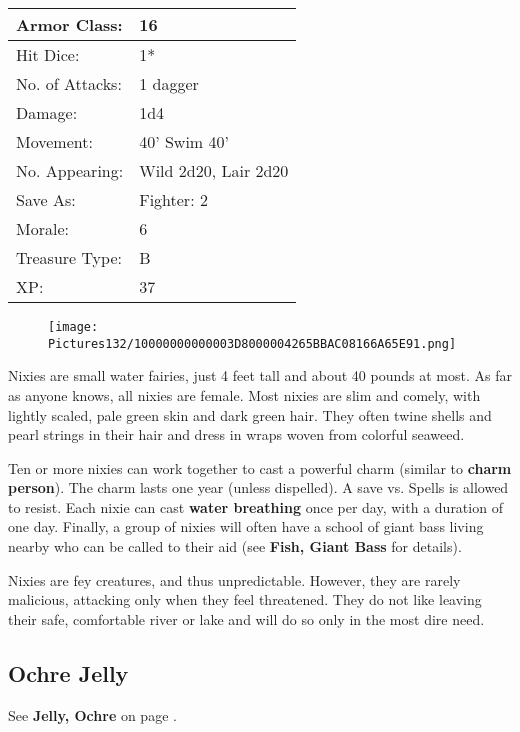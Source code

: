 \documentclass[a4paper,twoside,openany,10pt]{book}
\begin{document}
\begin{multicols}{2}
\begin{tabularx}{0.50\textwidth}{@{}lX@{}}
Armor Class: & 16 \\\hline
Hit Dice: & 1* \\\hline
No. of Attacks: & 1 dagger \\\hline
Damage: & 1d4 \\\hline
Movement: & 40' Swim 40' \\\hline
No. Appearing: & Wild 2d20, Lair 2d20 \\\hline
Save As: & Fighter: 2 \\\hline
Morale: & 6 \\\hline
Treasure Type: & B \\\hline
XP: & 37 \\\hline
\end{tabularx}\medskip

\begin{wrapfigure}{l}{0.25\textwidth}
	\texttt{[image: Pictures132/10000000000003D8000004265BBAC08166A65E91.png]}
\end{wrapfigure}

Nixies are small water fairies, just 4 feet tall and about 40 pounds at most. As far as anyone knows, all nixies are female. Most nixies are slim and comely, with lightly scaled, pale green skin and dark green hair. They often twine shells and pearl strings in their hair and dress in wraps woven from colorful seaweed.

Ten or more nixies can work together to cast a powerful charm (similar to \textbf{charm person}). The charm lasts one year (unless dispelled). A save vs. Spells is allowed to resist. Each nixie can cast \textbf{water breathing }once per day, with a duration of one day. Finally, a group of nixies will often have a school of giant bass living nearby who can be called to their aid (see \textbf{Fish, Giant Bass} for details).

Nixies are fey creatures, and thus unpredictable. However, they are rarely malicious, attacking only when they feel threatened. They do not like leaving their safe, comfortable river or lake and will do so only in the most dire need.

\subsection*{Ochre Jelly}\label{ochre-jelly}

See \textbf{Jelly, Ochre }on page
\hyperlink{jelly-ochre}{\pageref{jelly-ochre}}.


\end{multicols}
\end{document}
